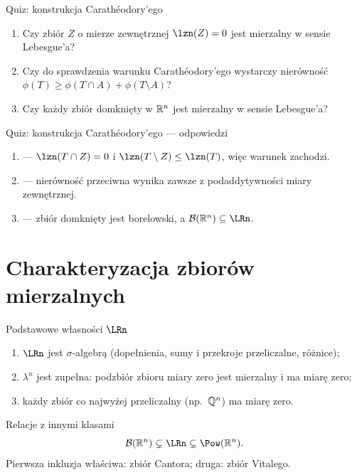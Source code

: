 \documentclass[aspectratio=169,11pt,t,envcountsect,professionalfonts]{beamer}
\begin{document}
\begin{frame}{Quiz: konstrukcja Carathéodory'ego}
  \begin{enumerate}
    \item Czy zbiór $Z$ o mierze zewnętrznej $\lzn(Z) = 0$ jest mierzalny w sensie Lebesgue'a?
    \item Czy do sprawdzenia warunku Carathéodory'ego wystarczy nierówność $\phi(T) \ge \phi(T \cap A) + \phi(T \setminus A)$?
    \item Czy każdy zbiór domknięty w $\mathbb{R}^{n}$ jest mierzalny w sensie Lebesgue'a?
  \end{enumerate}
\end{frame}

\begin{frame}{Quiz: konstrukcja Carathéodory'ego --- odpowiedzi}
  \begin{enumerate}
    \item \TAK{} --- $\lzn(T \cap Z) = 0$ i $\lzn(T \setminus Z) \le \lzn(T)$, więc warunek zachodzi.
    \item \TAK{} --- nierówność przeciwna wynika zawsze z podaddytywności miary zewnętrznej.
    \item \TAK{} --- zbiór domknięty jest borelowski, a $\BorelRn \subseteq \LRn$.
  \end{enumerate}
\end{frame}

\section{Charakteryzacja zbiorów mierzalnych}

\begin{frame}{Podstawowe własności $\LRn$}
  \begin{mythm}
    \begin{enumerate}
      \item $\LRn$ jest $\sigma$-algebrą (dopełnienia, sumy i przekroje przeliczalne, różnice);
      \item $\lambda^n$ jest zupełna: podzbiór zbioru miary zero jest mierzalny i ma miarę zero;
      \item każdy zbiór co najwyżej przeliczalny (np.\ $\mathbb{Q}^n$) ma miarę zero.
    \end{enumerate}
  \end{mythm}

  \begin{block}{Relacje z innymi klasami}
    \[
      \BorelRn \subsetneq \LRn \subsetneq \Pow(\Rn).
    \]
    Pierwsza inkluzja właściwa: zbiór Cantora; druga: zbiór Vitalego.
  \end{block}
\end{frame}
\end{document}
